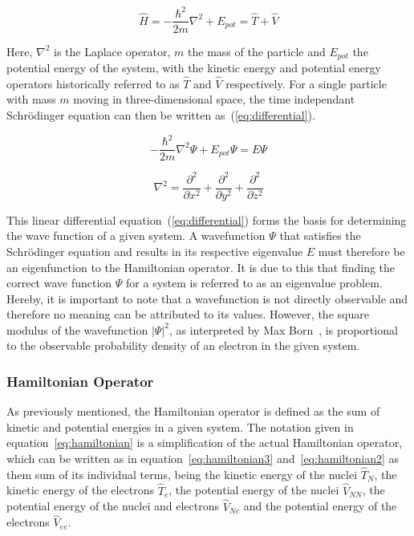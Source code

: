 \documentclass[11pt]{article}
\begin{document}
\begin{equation}
  \hat{H} = -\frac{\hbar^2}{2m}\nabla^2 + E_{pot} = \hat{T} + \hat{V}
  \label{eq:hamiltonian}
\end{equation}

\bigskip

\noindent Here, $\nabla^2$ is the Laplace operator, $m$ the mass of the particle and $E_{pot}$ the potential energy of the system, with the kinetic energy and potential energy operators historically referred to as $\hat{T}$ and $\hat{V}$ respectively.
For a single particle with mass $m$ moving in three-dimensional space, the time independant Schrödinger equation can then be written as~(\ref{eq:differential}).

\begin{equation}
  -\frac{\hbar^2}{2m}\nabla^2\Psi + E_{pot}\Psi = E\Psi
  \label{eq:differential}
\end{equation}

\begin{equation*}
  \nabla^2 = \frac{\partial^2}{\partial x^2} + \frac{\partial^2}{\partial y^2} + \frac{\partial^2}{\partial z^2}
\end{equation*}

\bigskip

\noindent This linear differential equation~(\ref{eq:differential}) forms the basis for determining the wave function of a given system. 
A wavefunction $\Psi$ that satisfies the Schrödinger equation and results in its respective eigenvalue $E$ must therefore be an eigenfunction to the Hamiltonian operator.
It is due to this that finding the correct wave function $\Psi$ for a system is referred to as an eigenvalue problem.\\
Hereby, it is important to note that a wavefunction is not directly observable and therefore no meaning can be attributed to its values.
However, the square modulus of the wavefunction $|\Psi|^2$, as interpreted by Max Born~\cite{Born1926}, is proportional to the observable probability density of an electron in the given system.

\subsubsection{Hamiltonian Operator}
As previously mentioned, the Hamiltonian operator is defined as the sum of kinetic and potential energies in a given system. 
The notation given in equation~\ref{eq:hamiltonian} is a simplification of the actual Hamiltonian operator, which can be written as in equation~\ref{eq:hamiltonian3} and~\ref{eq:hamiltonian2} as them sum of its individual terms, being the kinetic energy of the nuclei $\hat{T}_N$, the kinetic energy of the electrons $\hat{T}_e$, the potential energy of the nuclei $\hat{V}_{NN}$, the potential energy of the nuclei and electrons $\hat{V}_{Ne}$ and the potential energy of the electrons $\hat{V}_{ee}$.
\end{document}

